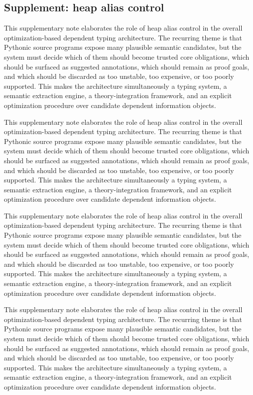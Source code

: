 \documentclass[11pt]{article}
\theoremstyle{definition}
\theoremstyle{plain}
\begin{document}
\subsection{Supplement: heap alias control}
This supplementary note elaborates the role of heap alias control in the overall
optimization-based dependent typing architecture. The recurring theme is that
Pythonic source programs expose many plausible semantic candidates, but the
system must decide which of them should become trusted core obligations, which
should be surfaced as suggested annotations, which should remain as proof
goals, and which should be discarded as too unstable, too expensive, or too
poorly supported. This makes the architecture simultaneously a typing system,
a semantic extraction engine, a theory-integration framework, and an explicit
optimization procedure over candidate dependent information objects.

This supplementary note elaborates the role of heap alias control in the overall
optimization-based dependent typing architecture. The recurring theme is that
Pythonic source programs expose many plausible semantic candidates, but the
system must decide which of them should become trusted core obligations, which
should be surfaced as suggested annotations, which should remain as proof
goals, and which should be discarded as too unstable, too expensive, or too
poorly supported. This makes the architecture simultaneously a typing system,
a semantic extraction engine, a theory-integration framework, and an explicit
optimization procedure over candidate dependent information objects.

This supplementary note elaborates the role of heap alias control in the overall
optimization-based dependent typing architecture. The recurring theme is that
Pythonic source programs expose many plausible semantic candidates, but the
system must decide which of them should become trusted core obligations, which
should be surfaced as suggested annotations, which should remain as proof
goals, and which should be discarded as too unstable, too expensive, or too
poorly supported. This makes the architecture simultaneously a typing system,
a semantic extraction engine, a theory-integration framework, and an explicit
optimization procedure over candidate dependent information objects.

This supplementary note elaborates the role of heap alias control in the overall
optimization-based dependent typing architecture. The recurring theme is that
Pythonic source programs expose many plausible semantic candidates, but the
system must decide which of them should become trusted core obligations, which
should be surfaced as suggested annotations, which should remain as proof
goals, and which should be discarded as too unstable, too expensive, or too
poorly supported. This makes the architecture simultaneously a typing system,
a semantic extraction engine, a theory-integration framework, and an explicit
optimization procedure over candidate dependent information objects.
\end{document}
